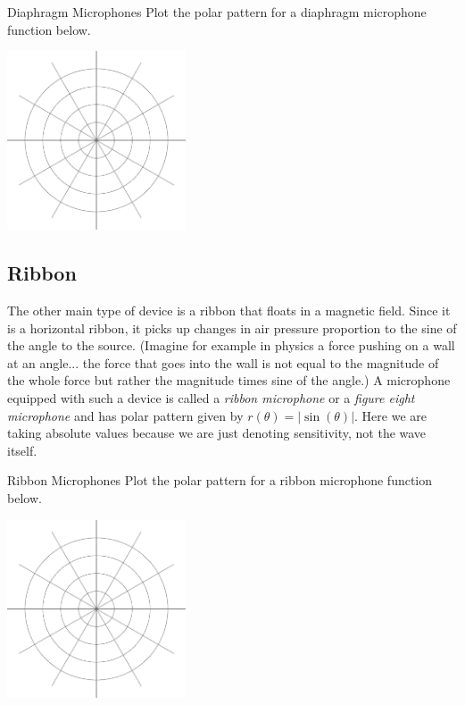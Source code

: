 \begin{exercise}{Diaphragm Microphones \Coffeecup}
Plot the polar pattern for a diaphragm microphone function below.
	\begin{center}
		\includegraphics[width=150pt]{polar.eps}
	\end{center}
\end{exercise}

\subsection{Ribbon}
The other main type of device is a ribbon that floats in a magnetic field.  Since it is a horizontal ribbon, it picks up changes in air pressure proportion to the sine of the angle to the source.  (Imagine for example in physics a force pushing on a wall at an angle... the force that goes into the wall is not equal to the magnitude of the whole force but rather the magnitude times sine of the angle.)  A microphone equipped with such a device is called a \emph{ribbon microphone} or a \emph{figure eight microphone} and has polar pattern given by $r(\theta)=\lvert \sin(\theta)\rvert$.  Here we are taking absolute values because we are just denoting sensitivity, not the wave itself.

\begin{exercise}{Ribbon Microphones \Coffeecup \Coffeecup}
Plot the polar pattern for a ribbon microphone function below.
	\begin{center}
		\includegraphics[width=150pt]{polar.eps}
	\end{center}
\end{exercise}


